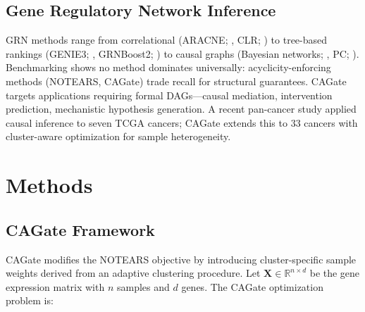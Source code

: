 \documentclass[12pt,a4paper]{article}
\begin{document}
\subsection{Gene Regulatory Network Inference}









GRN methods range from correlational (ARACNE; \cite{Margolin2006}, CLR; \cite{Faith2007}) to tree-based rankings (GENIE3; \cite{HuynhThu2010}, GRNBoost2; \cite{Moerman2019}) to causal graphs (Bayesian networks; \cite{Friedman2000}, PC; \cite{Spirtes2000}). Benchmarking \cite{Pratapa2020,Marbach2012} shows no method dominates universally: acyclicity-enforcing methods (NOTEARS, CAGate) trade recall for structural guarantees. CAGate targets applications requiring formal DAGs---causal mediation, intervention prediction, mechanistic hypothesis generation. A recent pan-cancer study \cite{Wang2024} applied causal inference to seven TCGA cancers; CAGate extends this to 33 cancers with cluster-aware optimization for sample heterogeneity.













\section{Methods}









\subsection{CAGate Framework}









CAGate modifies the NOTEARS objective by introducing cluster-specific sample weights derived from an adaptive clustering procedure. Let $\mathbf{X} \in \mathbb{R}^{n \times d}$ be the gene expression matrix with $n$ samples and $d$ genes. The CAGate optimization problem is:
\end{document}
